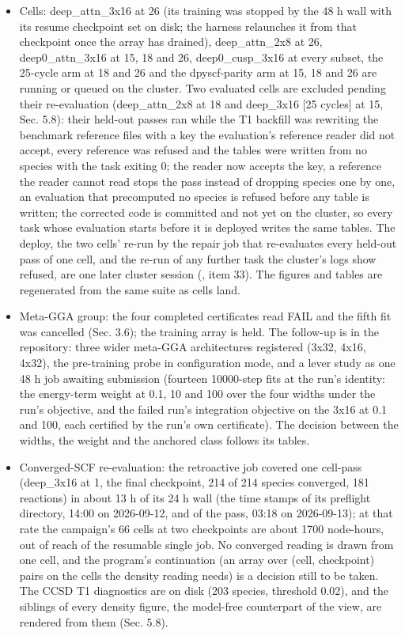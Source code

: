 \documentclass[10pt,a4paper]{article}
\begin{document}
\begin{itemize}
\item Cells: deep\_attn\_3x16 at 26 (its training was stopped by the 48 h wall with its resume checkpoint set on disk; the harness relaunches it from that checkpoint once the array has drained), deep\_attn\_2x8 at 26, deep0\_attn\_3x16 at 15, 18 and 26, deep0\_cusp\_3x16 at every subset, the 25-cycle arm at 18 and 26 and the dpyscf-parity arm at 15, 18 and 26 are running or queued on the cluster. Two evaluated cells are excluded pending their re-evaluation (deep\_attn\_2x8 at 18 and deep\_3x16 [25 cycles] at 15, Sec. 5.8): their held-out passes ran while the T1 backfill was rewriting the benchmark reference files with a key the evaluation's reference reader did not accept, every reference was refused and the tables were written from no species with the task exiting 0; the reader now accepts the key, a reference the reader cannot read stops the pass instead of dropping species one by one, an evaluation that precomputed no species is refused before any table is written; the corrected code is committed and not yet on the cluster, so every task whose evaluation starts before it is deployed writes the same tables. The deploy, the two cells' re-run by the repair job that re-evaluates every held-out pass of one cell, and the re-run of any further task the cluster's logs show refused, are one later cluster session (, item 33). The figures and tables are regenerated from the same suite as cells land.
\item Meta-GGA group: the four completed certificates read FAIL and the fifth fit was cancelled (Sec. 3.6); the training array is held. The follow-up is in the repository: three wider meta-GGA architectures registered (3x32, 4x16, 4x32), the pre-training probe in configuration mode, and a lever study as one 48 h job awaiting submission (fourteen 10000-step fits at the run's identity: the energy-term weight at 0.1, 10 and 100 over the four widths under the run's objective, and the failed run's integration objective on the 3x16 at 0.1 and 100, each certified by the run's own certificate). The decision between the widths, the weight and the anchored class follows its tables.
\item Converged-SCF re-evaluation: the retroactive job covered one cell-pass (deep\_3x16 at 1, the final checkpoint, 214 of 214 species converged, 181 reactions) in about 13 h of its 24 h wall (the time stamps of its preflight directory, 14:00 on 2026-09-12, and of the pass, 03:18 on 2026-09-13); at that rate the campaign's 66 cells at two checkpoints are about 1700 node-hours, out of reach of the resumable single job. No converged reading is drawn from one cell, and the program's continuation (an array over (cell, checkpoint) pairs on the cells the density reading needs) is a decision still to be taken. The CCSD T1 diagnostics are on disk (203 species, threshold 0.02), and the  siblings of every density figure, the model-free counterpart of the  view, are rendered from them (Sec. 5.8).

\end{itemize}
\end{document}
